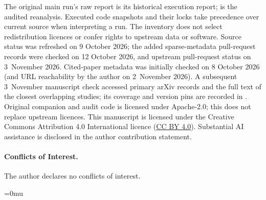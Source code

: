 \documentclass[10pt,a4paper]{article}
\begin{document}
The original main run's raw report is its historical execution report;
 is the audited reanalysis. Executed
code snapshots and their locks take precedence over current source when
interpreting a run. The inventory does not select redistribution licences
or confer rights to upstream data or software. Source status was refreshed
on 9 October 2026; the added sparse-metadata pull-request records were
checked on 12 October 2026, and upstream pull-request status on 3~November
2026. Cited-paper metadata was initially checked on 8 October 2026 (and URL
reachability by the author on 2~November 2026). A subsequent 3~November
manuscript check accessed primary arXiv records and the full text of the
closest overlapping studies; its coverage and version pins are recorded
in .
Original companion and audit code is licensed under Apache-2.0; this does not replace
upstream licences. This manuscript is licensed under the Creative Commons
Attribution 4.0 International licence
(\href{https://creativecommons.org/licenses/by/4.0/}{CC BY 4.0}). Substantial AI assistance is
disclosed in the author contribution statement.

\paragraph{Conflicts of Interest.} The author declares no conflicts of interest.


\begingroup
\raggedright
\Urlmuskip=0mu

\endgroup
\end{document}
